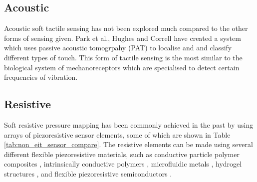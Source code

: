 \subsection{Acoustic}
Acoustic soft tactile sensing has not been explored much compared to the other forms of sensing given. Park et al., Hughes and Correll \cite{Park2022,Hughes2015} have created a system which uses passive acoustic tomogrpahy (PAT) to localise and and classify different types of touch. This form of tactile sensing is the most similar to the biological system of mechanoreceptors which are specialised to detect certain frequencies of vibration.


\subsection{Resistive}
Soft resistive pressure mapping has been commonly achieved in the past by using arrays of piezoresistive sensor elements, some of which are shown in Table \ref{tab:non_eit_sensor_compare}. The resistive elements can be made using several different flexible piezoresistive materials, such as conductive particle polymer composites \cite{Sun2020,Lu2014,Spahr2017}, intrinsically conductive polymers \cite{Lu2014,Hazelton2023,Mukherjee2023}, microfluidic metals \cite{Park2010,Jung2015,Kim2019}, hydrogel structures \cite{Yuk2016,Park2022,Chen2023}, and flexible piezoresistive semiconductors \cite{Xu2023,Sim2019}.

